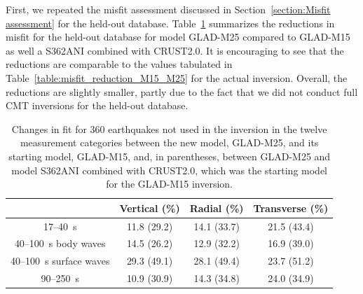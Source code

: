 \documentclass[extra,mreferee]{gji}
\begin{document}
First, we repeated the misfit assessment discussed in
Section~\ref{section:Misfit assessment} for the held-out database.
Table~\ref{table:misfit_reduction_M15_M25_360} summarizes the reductions
in misfit for the held-out database for model GLAD-M25 compared to GLAD-M15
as well a S362ANI combined with CRUST2.0.
It is encouraging to see that the reductions are comparable to the
values tabulated in Table~\ref{table:misfit_reduction_M15_M25} for the actual inversion.
Overall, the reductions are slightly smaller, partly due to the fact that we did not
conduct full CMT inversions for the held-out database.

\begin{table}
  \centering
  \begin{tabular}{|c|c|c|c|}
  \hline
  ~          &  Vertical (\%) & Radial (\%) &  Transverse (\%) \\
  \hline
  17--40~s                &          11.8 (29.2) &       14.1 (33.7) &       21.5 (43.4) \\
  40--100~s body waves    &          14.5 (26.2) &       12.9 (32.2)  &       16.9 (39.0) \\
  40--100~s surface waves &          29.3 (49.1) &       28.1 (49.4) &       23.7 (51.2) \\
  90--250~s               &          10.9 (30.9) &       14.3 (34.8)  &       24.0 (34.9) \\
  \hline
  \end{tabular}\\
  \caption{\small{Changes in fit for 360 earthquakes not used in the inversion in the twelve measurement categories
between the new model, GLAD-M25, and its starting model, GLAD-M15, and, in parentheses, between GLAD-M25 and model S362ANI combined with CRUST2.0, which was the starting model for the GLAD-M15 inversion.}}
  \label{table:misfit_reduction_M15_M25_360}
\end{table}

\end{document}
